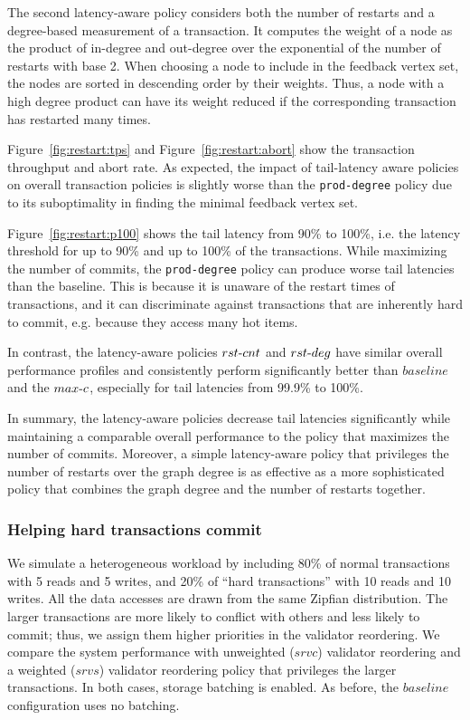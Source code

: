 The second latency-aware policy considers both the number of restarts and a degree-based measurement of a transaction. It computes the weight of a node as the product of in-degree and out-degree over the exponential of the number of restarts with base 2. When choosing a node to include in the feedback vertex set, the nodes are sorted in descending order by their weights. Thus, a node with a high degree product can have its weight reduced if the corresponding transaction has restarted many times.

Figure~\ref{fig:restart:tps} and Figure~\ref{fig:restart:abort} show the transaction throughput and abort rate. As expected, the impact of tail-latency aware policies on overall transaction policies is slightly worse than the \texttt{prod-degree} policy due to its suboptimality in finding the minimal feedback vertex set.

Figure~\ref{fig:restart:p100} shows the tail latency from 90\% to 100\%, i.e. the latency threshold for up to 90\% and up to 100\% of the transactions. While maximizing the number of commits, the \texttt{prod-degree} policy can produce worse tail latencies than the baseline. This is because it is unaware of the restart times of transactions, and it can discriminate against transactions that are inherently hard to commit, e.g. because they access many hot items.

In contrast, the latency-aware policies $rst\hbox{-}cnt$ and $rst\hbox{-}deg$ have similar overall performance profiles and consistently perform significantly better than $baseline$ and the $max\hbox{-}c$, especially for tail latencies from 99.9\% to 100\%.  

In summary, the latency-aware policies decrease tail latencies significantly while maintaining a comparable overall performance to the policy that maximizes the number of commits. Moreover, a simple latency-aware policy that privileges the number of restarts over the graph degree is as effective as a more sophisticated policy that combines the graph degree and the number of restarts together.


\subsubsection{Helping hard transactions commit}

We simulate a heterogeneous workload by including 80\% of normal transactions with 5 reads and 5 writes, and 20\% of ``hard transactions'' with 10 reads and 10 writes. All the data accesses are drawn from the same Zipfian distribution. The larger transactions are more likely to conflict with others and less likely to commit; thus, we assign them higher priorities in the validator reordering. We compare the system performance with unweighted ($srvc$) validator reordering and a weighted ($srvs$) validator reordering policy that privileges the larger transactions. In both cases, storage batching is enabled. As before, the $baseline$ configuration uses no batching.

